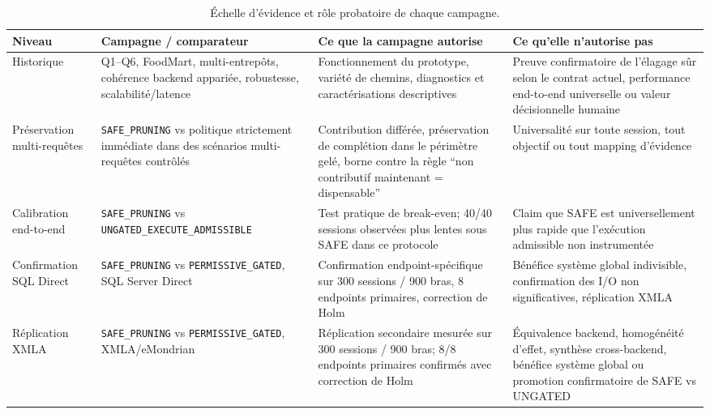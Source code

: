 \begin{table}[!t]
\centering
\caption{Échelle d'évidence et rôle probatoire de chaque campagne.}
\label{tab:evidence-ladder}
\scriptsize
\setlength{\tabcolsep}{3pt}
\renewcommand{\arraystretch}{1.08}
\begin{tabularx}{\textwidth}{@{}p{}p{}p{}X@{}}
\toprule
Niveau & Campagne / comparateur & Ce que la campagne autorise & Ce qu'elle n'autorise pas \\
\midrule
Historique & Q1--Q6, FoodMart, multi-entrepôts, cohérence backend appariée, robustesse, scalabilité/latence & Fonctionnement du prototype, variété de chemins, diagnostics et caractérisations descriptives & Preuve confirmatoire de l'élagage sûr selon le contrat actuel, performance end-to-end universelle ou valeur décisionnelle humaine \\
Préservation multi-requêtes & \texttt{SAFE\_PRUNING} vs politique strictement immédiate dans des scénarios multi-requêtes contrôlés & Contribution différée, préservation de complétion dans le périmètre gelé, borne contre la règle ``non contributif maintenant = dispensable'' & Universalité sur toute session, tout objectif ou tout mapping d'évidence \\
Calibration end-to-end & \texttt{SAFE\_PRUNING} vs \texttt{UNGATED\_EXECUTE\_ADMISSIBLE} & Test pratique de break-even; 40/40 sessions observées plus lentes sous SAFE dans ce protocole & Claim que SAFE est universellement plus rapide que l'exécution admissible non instrumentée \\
Confirmation SQL Direct & \texttt{SAFE\_PRUNING} vs \texttt{PERMISSIVE\_GATED}, SQL Server Direct & Confirmation endpoint-spécifique sur 300 sessions / 900 bras, 8 endpoints primaires, correction de Holm & Bénéfice système global indivisible, confirmation des I/O non significatives, réplication XMLA \\
Réplication XMLA & \texttt{SAFE\_PRUNING} vs \texttt{PERMISSIVE\_GATED}, XMLA/eMondrian & Réplication secondaire mesurée sur 300 sessions / 900 bras; 8/8 endpoints primaires confirmés avec correction de Holm & Équivalence backend, homogénéité d'effet, synthèse cross-backend, bénéfice système global ou promotion confirmatoire de SAFE vs UNGATED \\
\bottomrule
\end{tabularx}
\end{table}
